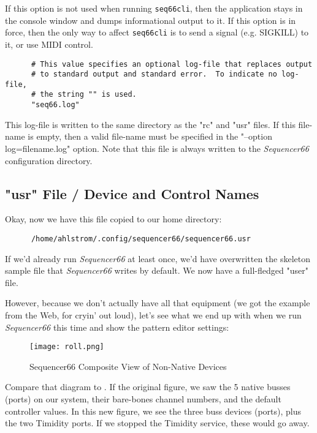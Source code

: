    If this option is not used when running \texttt{seq66cli}, then the
   application stays in the console window and dumps informational output to
   it.  If this option is in force, then the only way to affect
   \texttt{seq66cli} is to send a signal (e.g. SIGKILL) to it, or use
   MIDI control.

   \begin{verbatim}
      # This value specifies an optional log-file that replaces output
      # to standard output and standard error.  To indicate no log-file,
      # the string "" is used.
      "seq66.log"
   \end{verbatim}

   This log-file is written to the same directory as the "rc" and "usr" files.
   If this file-name is empty, then a valid file-name must be specified
   in the "--option log=filename.log" option.  Note that this file
   is always written to the \textsl{Sequencer66} configuration directory.

\subsection{"usr" File / Device and Control Names}
\label{subsec:seq66_usr_file_midi_bus_results}

   Okay, now we have this file copied to our home directory:

   \begin{verbatim}
      /home/ahlstrom/.config/sequencer66/sequencer66.usr
   \end{verbatim}

   If we'd already run \textsl{Sequencer66} at least once, we'd have
   overwritten the skeleton sample file that \textsl{Sequencer66}
   writes by default.  We now have a full-fledged "user" file.

   However, because we don't actually have all that equipment (we got the
   example from the Web, for cryin' out loud), let's see what we end up with
   when we run \textsl{Sequencer66} this time and show the pattern editor
   settings:

\begin{figure}[H]
   \centering 
   \texttt{[image: roll.png]}
   \caption{Sequencer66 Composite View of Non-Native Devices}
   \label{fig:seq66_manual_0_userfile_buss_dropdown}
\end{figure}

   Compare that diagram to .
   If the original figure, we saw the 5 native busses (ports) on our system,
   their bare-bones channel numbers, and the default controller values.  In
   this new figure, we see the three buss devices (ports), plus the two
   Timidity ports.  If we stopped the Timidity service, these would go away.

